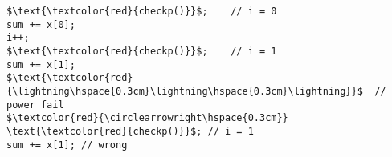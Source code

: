 \documentclass[border={20pt 5pt 10pt 10pt}]{standalone} %
\begin{document}
	

\begin{lstlisting}[style=mystyle, linewidth=115px]
$\text{\textcolor{red}{checkp()}}$;    // i = 0
sum += x[0];
i++;
$\text{\textcolor{red}{checkp()}}$;    // i = 1
sum += x[1];
$\text{\textcolor{red}{\lightning\hspace{0.3cm}\lightning\hspace{0.3cm}\lightning}}$  // power fail
$\textcolor{red}{\circlearrowright\hspace{0.3cm}} \text{\textcolor{red}{checkp()}}$; // i = 1
sum += x[1]; // wrong
\end{lstlisting} 
\end{document}
